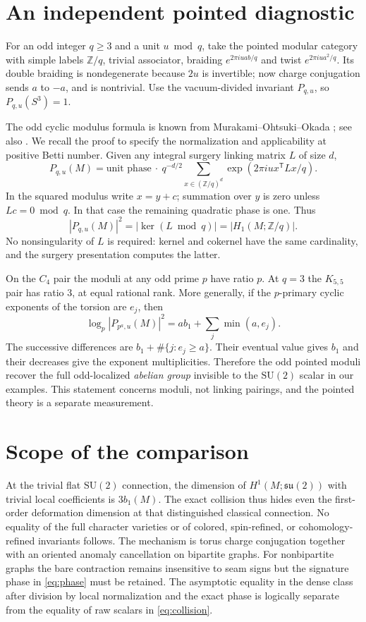 \documentclass[11pt]{article}
\theoremstyle{remark}
\newcommand{\SU}{\mathrm{SU}}
\begin{document}
\section{An independent pointed diagnostic}
For an odd integer \(q\ge3\) and a unit \(u\bmod q\), take the pointed modular category with simple labels \(\mathbb Z/q\), trivial associator, braiding \(e^{2\pi i uab/q}\) and twist \(e^{2\pi i ua^2/q}\). Its double braiding is nondegenerate because \(2u\) is invertible; now charge conjugation sends \(a\) to \(-a\), and is nontrivial. Use the vacuum-divided invariant \(P_{q,u}\), so \(P_{q,u}(S^3)=1\).

The odd cyclic modulus formula is known from Murakami--Ohtsuki--Okada \cite[Theorem~3.2]{MOO}; see also \cite[Lemma~7.1]{Funar}. We recall the proof to specify the normalization and applicability at positive Betti number. Given any integral surgery linking matrix \(L\) of size \(d\),
\[
 P_{q,u}(M)=\text{unit phase}\ \cdot\
 q^{-d/2}\sum_{x\in(\mathbb Z/q)^d}\exp(2\pi i u x^{\mathsf T}Lx/q).
\]
In the squared modulus write \(x=y+c\); summation over \(y\) is zero unless \(Lc=0\bmod q\). In that case the remaining quadratic phase is one. Thus
\begin{equation}
  |P_{q,u}(M)|^2=|\ker(L\bmod q)|=|H_1(M;\mathbb Z/q)|.
  \label{eq:pointed}
\end{equation}
No nonsingularity of \(L\) is required: kernel and cokernel have the same cardinality, and the surgery presentation computes the latter.

On the \(C_4\) pair the moduli at any odd prime \(p\) have ratio \(p\). At \(q=3\) the \(K_{5,5}\) pair has ratio \(3\), at equal rational rank. More generally, if the \(p\)-primary cyclic exponents of the torsion are \(e_j\), then
\[
       \log_p |P_{p^a,u}(M)|^2=a b_1+\sum_j\min(a,e_j).
\]
The successive differences are \(b_1+\#\{j:e_j\ge a\}\). Their eventual value gives \(b_1\) and their decreases give the exponent multiplicities. Therefore the odd pointed moduli recover the full odd-localized \emph{abelian group} invisible to the \(\SU(2)\) scalar in our examples. This statement concerns moduli, not linking pairings, and the pointed theory is a separate measurement.



\section{Scope of the comparison}
At the trivial flat \(\SU(2)\) connection, the dimension of \(H^1(M;\mathfrak{su}(2))\) with trivial local coefficients is \(3b_1(M)\). The exact collision thus hides even the first-order deformation dimension at that distinguished classical connection. No equality of the full character varieties or of colored, spin-refined, or cohomology-refined invariants follows. The mechanism is torus charge conjugation together with an oriented anomaly cancellation on bipartite graphs. For nonbipartite graphs the bare contraction remains insensitive to seam signs but the signature phase in \eqref{eq:phase} must be retained. The asymptotic equality in the dense class after division by local normalization and the exact phase is logically separate from the equality of raw scalars in \eqref{eq:collision}.
\end{document}
